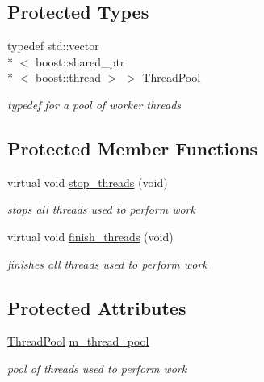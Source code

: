 \subsection*{Protected Types}
\begin{DoxyCompactItemize}
\item 
typedef std\-::vector\\*
$<$ boost\-::shared\-\_\-ptr\\*
$<$ boost\-::thread $>$ $>$ \hyperlink{classpion_1_1multi__thread__scheduler_a0cf5fa4c72b0c1f38043cf9ea61efeef}{Thread\-Pool}
\begin{DoxyCompactList}\small\item\em typedef for a pool of worker threads \end{DoxyCompactList}\end{DoxyCompactItemize}
\subsection*{Protected Member Functions}
\begin{DoxyCompactItemize}
\item 
virtual void \hyperlink{classpion_1_1multi__thread__scheduler_a91945cc6c4a05a716fec36fc48474265}{stop\-\_\-threads} (void)
\begin{DoxyCompactList}\small\item\em stops all threads used to perform work \end{DoxyCompactList}\item 
virtual void \hyperlink{classpion_1_1multi__thread__scheduler_a5e602b3bb9fd7208e7d3325f596e8266}{finish\-\_\-threads} (void)
\begin{DoxyCompactList}\small\item\em finishes all threads used to perform work \end{DoxyCompactList}\end{DoxyCompactItemize}
\subsection*{Protected Attributes}
\begin{DoxyCompactItemize}
\item 
\hyperlink{classpion_1_1multi__thread__scheduler_a0cf5fa4c72b0c1f38043cf9ea61efeef}{Thread\-Pool} \hyperlink{classpion_1_1multi__thread__scheduler_ad2b984248e4b064faae3cc3c7e75d30e}{m\-\_\-thread\-\_\-pool}
\begin{DoxyCompactList}\small\item\em pool of threads used to perform work \end{DoxyCompactList}\end{DoxyCompactItemize}

